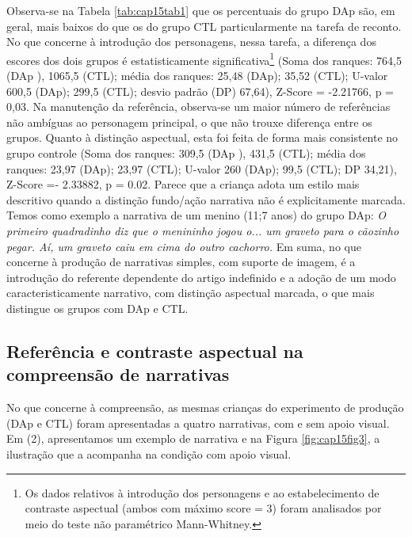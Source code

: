 \documentclass[output=paper,colorlinks,citecolor=brown,booklanguage=portuguese]{langscibook}
\begin{document}
Observa-se na Tabela \ref{tab:cap15tab1} que os percentuais do grupo DAp são, em geral, mais baixos do que os do grupo CTL particularmente na tarefa de reconto. No que concerne à introdução dos personagens, nessa tarefa, a diferença dos escores dos dois grupos é  estatisticamente significativa\footnote{Os dados relativos à introdução dos personagens e ao estabelecimento de contraste aspectual (ambos com máximo score = 3) foram analisados por meio do teste não paramétrico Mann-Whitney.} (Soma dos ranques: 764,5 (DAp ), 1065,5 (CTL); média dos ranques: 25,48 (DAp); 35,52 (CTL); U-valor 600,5 (DAp); 299,5 (CTL); desvio padrão (DP) 67,64), Z-Score = -2.21766, p =  0,03. Na manutenção da referência, observa-se um maior número de referências não ambíguas ao personagem principal, o que não trouxe diferença entre os grupos. Quanto à distinção aspectual, esta foi feita de forma mais consistente no grupo controle (Soma dos ranques: 309,5 (DAp ), 431,5 (CTL); média dos ranques: 23,97 (DAp); 23,97 (CTL); U-valor 260 (DAp); 99,5 (CTL); DP 34,21), Z-Score =- 2.33882, p = 0.02. Parece que a criança adota um estilo mais descritivo quando a distinção fundo/ação narrativa não é explicitamente marcada. Temos como exemplo a narrativa de um menino (11;7 anos) do grupo DAp: \emph{O primeiro quadradinho diz que o menininho jogou o... um graveto para o cãozinho pegar. Aí, um graveto caiu em cima do outro cachorro.} Em suma, no que concerne à produção de narrativas simples, com suporte de imagem, é a introdução do referente dependente do artigo indefinido e a adoção de um modo caracteristicamente narrativo, com distinção aspectual marcada, o que mais distingue os grupos com DAp e CTL. 

\subsection{Referência e contraste aspectual na compreensão de narrativas}
No que concerne à compreensão, as mesmas crianças do experimento de produção (DAp e CTL) foram apresentadas a quatro narrativas, com e sem apoio visual. Em (2), apresentamos um exemplo de narrativa e na Figura \ref{fig:cap15fig3}, a ilustração que a acompanha na condição com apoio visual. 
\end{document}
